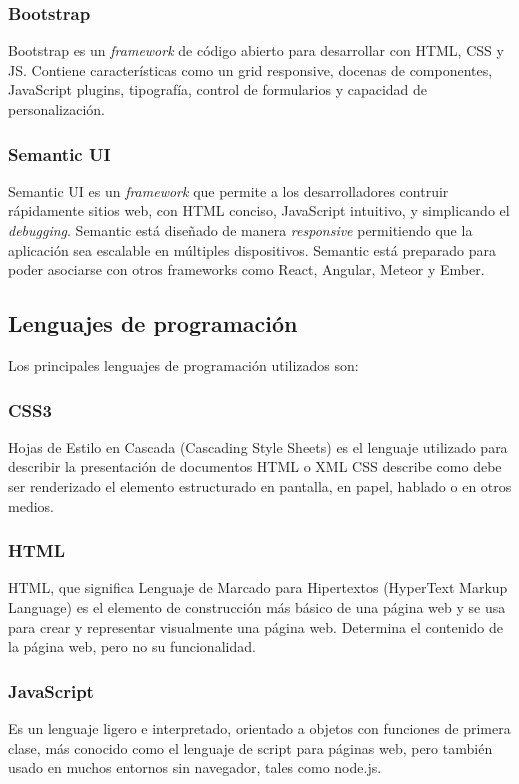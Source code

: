 \subsubsection{Bootstrap}
Bootstrap es un \textit{framework} de código abierto para desarrollar con HTML, CSS y JS. Contiene características como un grid responsive, docenas de componentes, JavaScript plugins, tipografía, control de formularios y capacidad de personalización\cite{bootstrap}.


\subsubsection{Semantic UI}
Semantic UI es un \textit{framework} que permite a los desarrolladores contruir rápidamente sitios web, con HTML conciso, JavaScript intuitivo, y simplicando el \textit{debugging}. Semantic está diseñado de manera \textit{responsive} permitiendo que la aplicación sea escalable en múltiples dispositivos. Semantic está preparado para poder asociarse con otros frameworks como React, Angular, Meteor y Ember\cite{semantic_github}.


\subsection{Lenguajes de programación}
Los principales lenguajes de programación utilizados son:


\subsubsection{CSS3}
Hojas de Estilo en Cascada (Cascading Style Sheets) es el lenguaje utilizado para describir la presentación de documentos HTML o XML CSS describe como debe ser renderizado el elemento estructurado en pantalla, en papel, hablado o en otros medios\cite{css_mozilla}.


\subsubsection{HTML}
HTML, que significa Lenguaje de Marcado para Hipertextos (HyperText Markup Language) es el elemento de construcción más básico de una página web y se usa para crear y representar visualmente una página web. Determina el contenido de la página web, pero no su funcionalidad\cite{html_mozilla}.


\subsubsection{JavaScript}
Es un lenguaje ligero e interpretado, orientado a objetos con funciones de primera clase, más conocido como el lenguaje de script para páginas web, pero también usado en muchos entornos sin navegador, tales como node.js.


